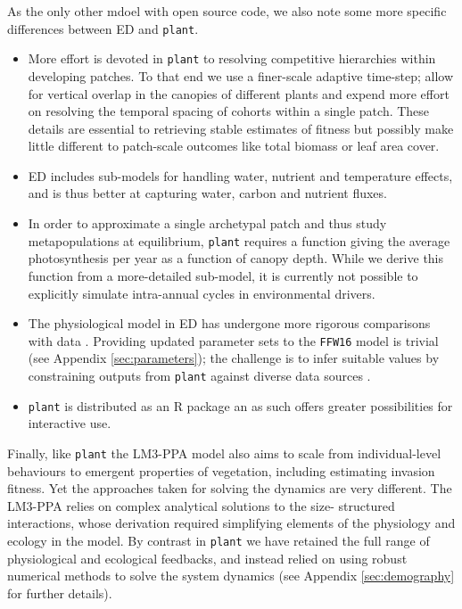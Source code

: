 \documentclass[a4paper,11pt]{article}
\newcommand{\plant}{\texttt{plant}}
\begin{document}
As the only other mdoel with open source code, we also note some more specific 
differences between \textsc{ED} and {\plant}.
\begin{itemize}
  \item More effort is devoted in {\plant} to resolving competitive
  hierarchies within developing patches. To that end we use a finer-scale 
  adaptive time-step; allow for vertical overlap in the canopies of different 
  plants and expend more effort on resolving the temporal spacing of cohorts
  within a single patch. These details are essential to retrieving stable
  estimates of fitness but possibly make little different to patch-scale
  outcomes like total biomass or leaf area cover. 
  
  \item  \textsc{ED} includes sub-models for handling water, nutrient and 
  temperature effects, and is thus better at capturing water, carbon and 
  nutrient fluxes.

  \item In order to approximate a single archetypal patch and thus study 
  metapopulations at equilibrium, {\plant} requires a function giving the 
  average photosynthesis per year as a function of canopy depth. While we
  derive this function from a more-detailed sub-model, it is currently not
  possible to explicitly simulate intra-annual cycles in environmental
  drivers.

  \item The physiological model in  \textsc{ED} has undergone more rigorous
  comparisons with data \citep[see][]{Medvigy-2009}.  Providing updated 
  parameter sets to the \texttt{FFW16} model is trivial (see Appendix 
  \ref{sec:parameters}); the challenge is to infer
  suitable values by constraining outputs from {\plant} against diverse
  data sources \citep[e.g.][]{Medvigy-2009, Lebauer-2012}. 

  \item {\plant} is distributed as an R package an as such offers greater
  possibilities for interactive use. 
\end{itemize}

Finally, like {\plant} the \textsc{LM3-PPA} \cite{Weng-2015} model also aims
to scale from individual-level behaviours to emergent properties of
vegetation, including estimating invasion fitness. Yet the approaches taken
for solving the dynamics are very different. The \textsc{LM3-PPA} relies on
complex analytical solutions to the size- structured interactions, whose
derivation required simplifying elements of the physiology and ecology in the
model. By contrast in {\plant} we have retained the full range of
physiological and ecological feedbacks, and instead relied on using robust
numerical methods to solve the system dynamics (see Appendix 
\ref{sec:demography} for further details).
\end{document}
